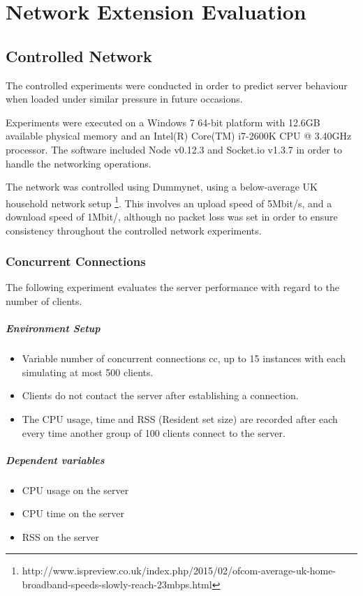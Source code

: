 \documentclass[bsc,frontabs,twoside,singlespacing,parskip,deptreport]{infthesis}     %
\begin{document}
\chapter{Network Extension Evaluation}

\section{Controlled Network}
The controlled experiments were conducted in order to predict server behaviour when loaded under similar pressure in future occasions. 

Experiments were executed on a Windows 7 64-bit platform with 12.6GB available physical memory and an Intel(R) Core(TM) i7-2600K CPU @ 3.40GHz processor. The software included Node v0.12.3 and Socket.io v1.3.7 in order to handle the networking operations.

The network was controlled using Dummynet, using a below-average UK household network setup \footnote{http://www.ispreview.co.uk/index.php/2015/02/ofcom-average-uk-home-broadband-speeds-slowly-reach-23mbps.html}. This involves an upload speed of 5Mbit/s, and a download speed of 1Mbit/, although no packet loss was set in order to ensure consistency throughout the controlled network experiments.

\subsection{Concurrent Connections}
The following experiment evaluates the server performance with regard to the number of clients.

\paragraph*{Environment Setup}
\begin{itemize}
\item Variable number of concurrent connections cc, up to 15 instances with each simulating at most 500 clients.
\item Clients do not contact the server after establishing a connection.
\item The CPU usage, time and RSS (Resident set size) are recorded after each every time another group of 100 clients connect to the server.
\end{itemize}
\paragraph*{Dependent variables}
\begin{itemize}
\item CPU usage on the server
\item CPU time on the server
\item RSS on the server
\end{itemize}
\end{document}
